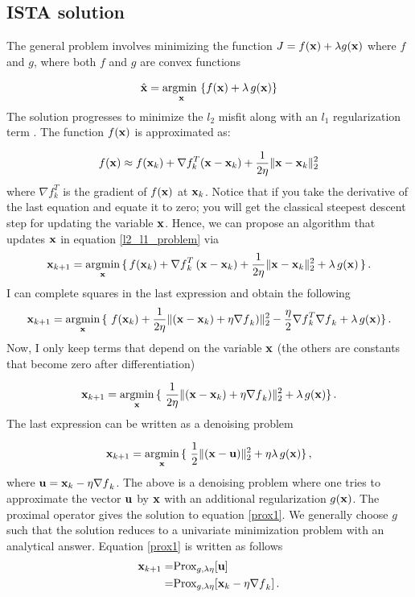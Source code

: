 \documentclass[11pt, oneside]{article}  	%
\def\be{\vspace{0.0cm}\begin{equation}}
\def\ee{\vspace{0.0cm}\end{equation}}
\def\nin{\noindent}
\begin{document}
\subsection{ISTA solution}

The general problem involves minimizing the function $J= f({\bf x}) + \lambda g({\bf x})$ where $f$ and $g$, where both \(f\) and \(g\) are convex functions

\be 
\hat{{\bf x }} = \underset{{\bf x}}{\mbox{argmin }} \{ f({\bf x}) + \lambda\, g({\bf x}) \} \label{general}
\ee
The solution progresses to minimize the \(l_2\) misfit along with an \(l_1\) regularization term \citep{ISTA}. The function \(f({\bf x})\) is approximated as:


\be f({\bf x}) \approx f({\bf x}_k) + \nabla f_k^T ({\bf x} - {\bf x}_k) + \frac{1}{2\eta} \| {\bf x} - {\bf x}_k\|_2^2
\label{approx} 
\ee
\nin
where $\nabla f_k^T$ is the gradient of $f({\bf x})$ at ${\bf x}_k$. Notice that if you take the derivative of the last equation and
equate it to zero; you will get the classical steepest descent step for updating the variable $\bf x$.
Hence, we can propose an algorithm that updates $\bf x$ in equation \ref{l2_l1_problem} via 
\be
{\bf x}_{k+1} = \underset{{\bf x}}{\mbox{argmin}} \, \{\, f({\bf x}_k) + {\nabla f}_k^T \,({\bf x} - {\bf x}_k) + \frac{1}{2\eta} \| {\bf x} - {\bf x}_k\|_2^2 +\lambda \,g({\bf x}) \,\}\,.
\ee
I can complete squares in the last expression and obtain the following 
\be
{\bf x}_{k+1} = \underset{{\bf x}}{\mbox{argmin}} \, \{\
  f({\bf x}_k)+ \frac{1}{2\eta} \| ({\bf x}- {\bf x}_k) + \eta {\nabla f}_k)\|_2^2- \frac{\eta}{2} {\nabla f}_k^T {\nabla f}_k + \lambda \,g({\bf x}) \}
  \,.
\ee
Now, I only keep terms that depend on the variable $\bf x$ (the others are constants that become zero after
differentiation)  

\be
{\bf x}_{k+1} = \underset{{\bf x}}{\mbox{argmin}} \, \{\
 \frac{1}{2\eta} \| ({\bf x}- {\bf x}_k) + \eta {\nabla f}_k)\|_2^2 + \lambda \,g({\bf x}) \}\,.
\ee
The last expression can be written as a denoising problem

\be
{\bf x}_{k+1} = \underset{{\bf x}}{\mbox{argmin}} \, \{\
 \frac{1}{2} \| ({\bf x} - {\bf u} )\|_2^2 + \eta \lambda \,g({\bf x}) \}\,, \label{prox1}
\ee
where ${\bf u} = {\bf x}_k - \eta {\nabla f}_k$. The above is a denoising problem where one tries to approximate the vector $
\bf u$ by $\bf x$ with an additional regularization $g({\bf x})$. The proximal operator gives the solution to equation \ref{prox1}. We generally choose $g$ such that the solution reduces to a univariate minimization problem with an analytical answer. Equation \ref{prox1} is written as follows
\begin{align}
{\bf x}_{k+1} =& \mbox{Prox}_{g,\lambda \eta} [{\bf u}]\\
           =& \mbox{Prox}_{g,\lambda \eta} [{\bf x}_{k} - \eta {\nabla f}_k]\,. \label{last} 
\end{align}
\end{document}
